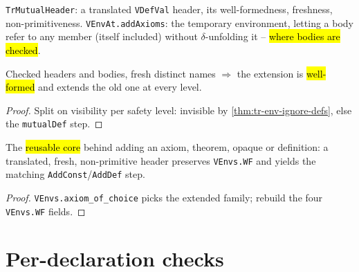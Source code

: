 \begin{definition}
\label{def:tr-mutual-header}
\leanok
{}

 \texttt{TrMutualHeader}: a translated \texttt{VDefVal} header, its
well-formedness, freshness, non-primitiveness. \texttt{VEnvAt.addAxioms}: the temporary
environment, letting a body refer to any member (itself included) without
$\delta$-unfolding it -- \hl{where bodies are checked}.
\end{definition}

\begin{lemma}
\label{thm:add-mutual-block-wf}
\leanok
{}

 Checked headers and bodies, fresh distinct names $\Rightarrow$ the
extension is \hl{well-formed} and extends the old one at every level.
\end{lemma}
\begin{proof}
\leanok
{} Split on visibility per safety level: invisible by \ref{thm:tr-env-ignore-defs},
else the \texttt{mutualDef} step.
\end{proof}

\begin{lemma}
\label{family:add-const-wf}
\leanok
{}

 The \hl{reusable core} behind adding an axiom, theorem, opaque or
definition: a translated, fresh, non-primitive header preserves \texttt{VEnvs.WF} and
yields the matching \texttt{AddConst}/\texttt{AddDef} step.
\end{lemma}
\begin{proof}
\leanok
{} \texttt{VEnvs.axiom\_of\_choice} picks the extended family; rebuild the four
\texttt{VEnvs.WF} fields.
\end{proof}

\section{Per-declaration checks}

